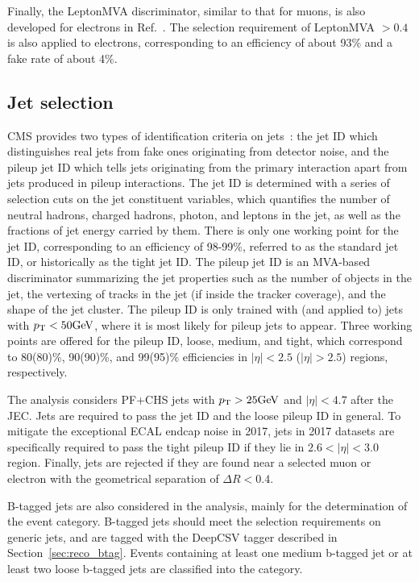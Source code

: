 Finally, the LeptonMVA discriminator, similar to that for muons, is also developed for electrons in Ref.~\cite{PhysRevLett.122.132003}. 
The selection requirement of LeptonMVA $> 0.4$ is also applied to electrons, 
corresponding to an efficiency of about 93\% and a fake rate of about 4\%.

\subsection{Jet selection}\label{sec:sel_jet}

CMS provides two types of identification criteria on jets~\cite{Sirunyan_2020}: the jet ID which distinguishes real jets from fake ones originating from detector noise,
and the pileup jet ID which tells jets originating from the primary interaction apart from jets produced in pileup interactions.
The jet ID is determined with a series of selection cuts on the jet constituent variables,
which quantifies the number of neutral hadrons, charged hadrons, photon, and leptons in the jet, 
as well as the fractions of jet energy carried by them.
There is only one working point for the jet ID, corresponding to an efficiency of 98-99\%, referred to as the standard jet ID, or historically as the tight jet ID.
The pileup jet ID is an MVA-based discriminator summarizing the jet properties such as the number of objects in the jet, 
the vertexing of tracks in the jet (if inside the tracker coverage), and the shape of the jet cluster.
The pileup ID is only trained with (and applied to) jets with $p_{\mathrm{T}} < 50 \mbox{GeV}$, where it is most likely for pileup jets to appear.
Three working points are offered for the pileup ID, loose, medium, and tight, 
which correspond to 80(80)\%, 90(90)\%, and 99(95)\% efficiencies in $|\eta| < 2.5$ ($|\eta| > 2.5$) regions, respectively.

The \hmm analysis considers PF+CHS jets with $p_{\mathrm{T}} > 25 \mbox{GeV}$ and $|\eta| < 4.7$ after the JEC. 
Jets are required to pass the jet ID and the loose pileup ID in general.
To mitigate the exceptional ECAL endcap noise in 2017,
jets in 2017 datasets are specifically required to pass the tight pileup ID if they lie in $2.6 < |\eta| < 3.0$ region.
Finally, jets are rejected if they are found near a selected muon or electron with the geometrical separation of $\Delta{}R < 0.4$.

B-tagged jets are also considered in the \hmm analysis, mainly for the determination of the \ttH event category.
B-tagged jets should meet the selection requirements on generic jets, and are tagged with the DeepCSV tagger described in Section~\ref{sec:reco_btag}.
Events containing at least one medium b-tagged jet or at least two loose b-tagged jets are classified into the \ttH category.